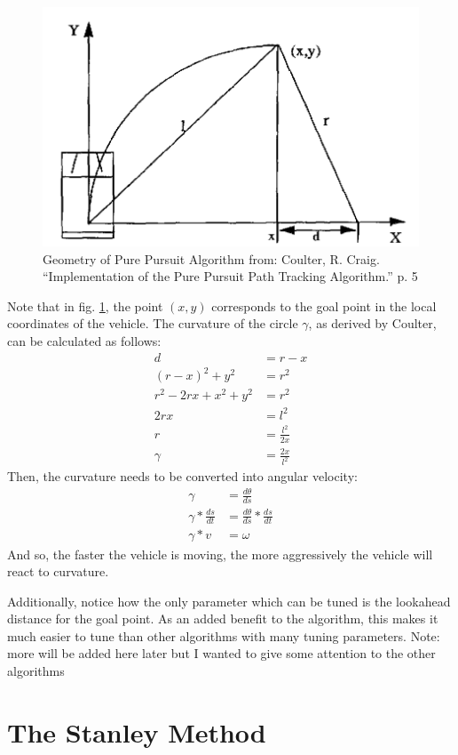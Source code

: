 \documentclass[mla7]{mla}
\begin{document}
\begin{paper}
\begin{figure}[H]
\includegraphics[width=0.4\linewidth]{CoulterPurePursuitDiagram}
\captionsetup{justification=centering,margin=2cm}
\caption{Geometry of Pure Pursuit Algorithm from: Coulter, R. Craig. “Implementation of the Pure Pursuit Path Tracking Algorithm.” p. 5}
\label{img:pp1}
\end{figure}

Note that in fig. \ref{img:pp1}, the point $(x,y)$ corresponds to the goal point in the local coordinates of the vehicle. The curvature of the circle $\gamma$, as derived by Coulter, can be calculated as follows:
\begin{subequations}
\begin{align}
d&=r-x \\
(r-x)^2+y^2&=r^2 \\
r^2-2rx+x^2+y^2&=r^2 \\
2rx&=l^2 \\
r&=\frac{l^2}{2x} \\
\gamma &= \frac{2x}{l^2}
\end{align}
\end{subequations}
 Then, the curvature needs to be converted into angular velocity:
\begin{subequations}
\begin{align}
\gamma &= \frac{d\theta}{ds} \\
\gamma * \frac{ds}{dt} &= \frac{d\theta}{ds} * \frac{ds}{dt} \\
\gamma * v &= \omega
\end{align}
\end{subequations}
And so, the faster the vehicle is moving, the more aggressively the vehicle will react to curvature.

Additionally, notice how the only parameter which can be tuned is the lookahead distance for the goal point. As an added benefit to the algorithm, this makes it much easier to tune than other algorithms with many tuning parameters. Note: more will be added here later but I wanted to give some attention to the other algorithms

\section{The Stanley Method}


\end{paper}
\end{document}
